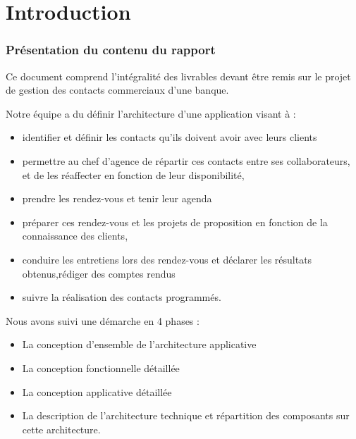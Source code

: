 





\listoftodos
\newpage
{}
\setcounter{tocdepth}{1}
\tableofcontents
\part{Introduction}
\label{part:introduction}

\section{Présentation du contenu du rapport}
\label{sec:presentation-du-contenu-du-rapport}
Ce document comprend l'intégralité des livrables devant être remis sur le projet de gestion des contacts commerciaux d'une banque. 

Notre équipe a du définir l'architecture d'une application visant à : \\
\begin{itemize}
\item identifier et définir les contacts qu’ils doivent avoir avec leurs clients
\item permettre au chef d’agence de répartir ces contacts entre ses collaborateurs, et de les réaffecter en fonction de leur disponibilité,
\item prendre les rendez-vous et tenir leur agenda
\item préparer ces rendez-vous et les projets de proposition en fonction de la connaissance des
clients,
\item conduire les entretiens lors des rendez-vous et déclarer les résultats obtenus,rédiger des comptes rendus
\item suivre la réalisation des contacts programmés.\\

\end{itemize}


Nous avons suivi une démarche en 4 phases : 
\begin{itemize}
\item La conception d’ensemble de l’architecture applicative
\item La conception fonctionnelle détaillée
\item La conception applicative détaillée
\item La description de l’architecture technique et répartition des composants sur cette
architecture.\\
\end{itemize}

